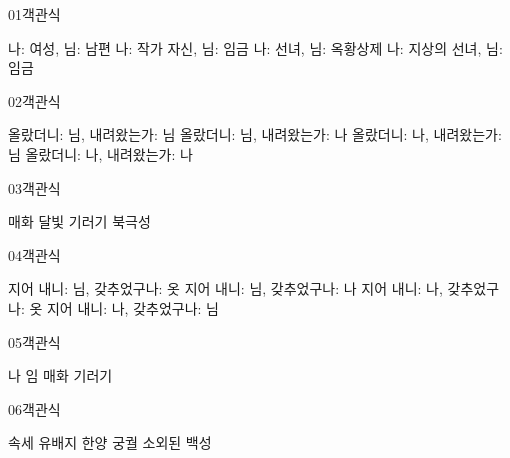 \documentclass[fs9,seriesRus]{korfarm-base}
\begin{document}
\par\medskip
\kfBeginMC
\begin{kfQBlock}{01}{객관식}
\begin{kfChoices}
\kfChoice 나: 여성, 님: 남편
\kfChoice 나: 작가 자신, 님: 임금
\kfChoice 나: 선녀, 님: 옥황상제
\kfChoice 나: 지상의 선녀, 님: 임금
\end{kfChoices}
\end{kfQBlock}
\begin{kfQBlock}{02}{객관식}
\begin{kfChoices}
\kfChoice 올랐더니: 님, 내려왔는가: 님
\kfChoice 올랐더니: 님, 내려왔는가: 나
\kfChoice 올랐더니: 나, 내려왔는가: 님
\kfChoice 올랐더니: 나, 내려왔는가: 나
\end{kfChoices}
\end{kfQBlock}
\begin{kfQBlock}{03}{객관식}
\begin{kfChoices}
\kfChoice 매화
\kfChoice 달빛
\kfChoice 기러기
\kfChoice 북극성
\end{kfChoices}
\end{kfQBlock}
\begin{kfQBlock}{04}{객관식}
\begin{kfChoices}
\kfChoice 지어 내니: 님, 갖추었구나: 옷
\kfChoice 지어 내니: 님, 갖추었구나: 나
\kfChoice 지어 내니: 나, 갖추었구나: 옷
\kfChoice 지어 내니: 나, 갖추었구나: 님
\end{kfChoices}
\end{kfQBlock}
\begin{kfQBlock}{05}{객관식}
\begin{kfChoices}
\kfChoice 나
\kfChoice 임
\kfChoice 매화
\kfChoice 기러기
\end{kfChoices}
\end{kfQBlock}
\begin{kfQBlock}{06}{객관식}
\begin{kfChoices}
\kfChoice 속세
\kfChoice 유배지
\kfChoice 한양 궁궐
\kfChoice 소외된 백성
\end{kfChoices}
\end{kfQBlock}
\end{document}
